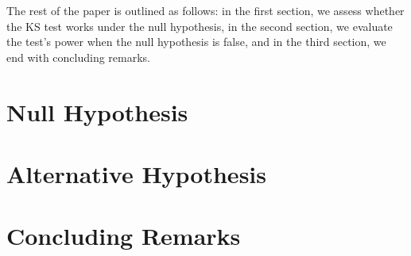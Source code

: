 \documentclass[12pt, letterpaper]{article}
\begin{document}
The rest of the paper is outlined as follows: in the first 
section, we assess whether the KS
test works under the null hypothesis, in the second section, we evaluate the 
test's 
power when the null hypothesis is false, and in the third section, we end with 
concluding remarks.

\section{Null Hypothesis}
\label{sec:null}



\section{Alternative Hypothesis}
\label{sec:alternative}



\section{Concluding Remarks}
\label{sec:conclusion}







\end{document}
